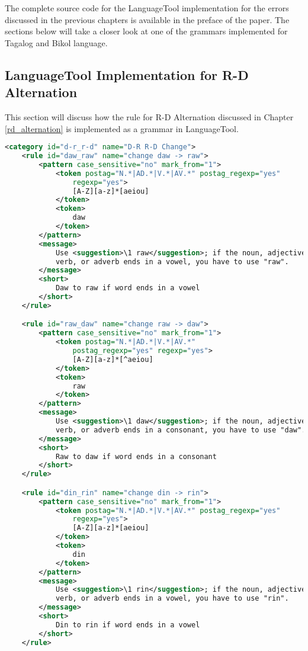 The complete source code for the LanguageTool implementation for the errors discussed in the previous chapters is available in the preface of the paper. The sections below will take a closer look at one of the grammars implemented for Tagalog and Bikol language.


\subsection{LanguageTool Implementation for R-D Alternation}

This section will discuss how the rule for R-D Alternation discussed in Chapter \ref{rd_alternation} is implemented as a grammar in LanguageTool.

\begin{lstlisting}[language= XML, caption=Grammar for R-D Alternation]
<category id="d-r_r-d" name="D-R R-D Change">
    <rule id="daw_raw" name="change daw -> raw">
        <pattern case_sensitive="no" mark_from="1">
            <token postag="N.*|AD.*|V.*|AV.*" postag_regexp="yes" 
                regexp="yes">
                [A-Z][a-z]*[aeiou]
            </token>
            <token>
                daw
            </token>
        </pattern>
        <message>
            Use <suggestion>\1 raw</suggestion>; if the noun, adjective, 
            verb, or adverb ends in a vowel, you have to use "raw".
        </message>
        <short>
            Daw to raw if word ends in a vowel
        </short>
    </rule>

    <rule id="raw_daw" name="change raw -> daw">
        <pattern case_sensitive="no" mark_from="1">
            <token postag="N.*|AD.*|V.*|AV.*" 
                postag_regexp="yes" regexp="yes">
                [A-Z][a-z]*[^aeiou]
            </token>
            <token>
                raw
            </token>
        </pattern>
        <message>
            Use <suggestion>\1 daw</suggestion>; if the noun, adjective, 
            verb, or adverb ends in a consonant, you have to use "daw".
        </message>
        <short>
            Raw to daw if word ends in a consonant
        </short>
    </rule>

    <rule id="din_rin" name="change din -> rin">
        <pattern case_sensitive="no" mark_from="1">
            <token postag="N.*|AD.*|V.*|AV.*" postag_regexp="yes" 
                regexp="yes">
                [A-Z][a-z]*[aeiou]
            </token>
            <token>
                din
            </token>
        </pattern>
        <message>
            Use <suggestion>\1 rin</suggestion>; if the noun, adjective,
            verb, or adverb ends in a vowel, you have to use "rin".
        </message>
        <short>
            Din to rin if word ends in a vowel
        </short>
    </rule>


\end{lstlisting}
